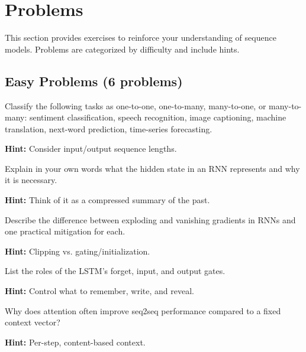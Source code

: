 
\section{Problems}
\label{sec:ch10-problems}

This section provides exercises to reinforce your understanding of sequence models. Problems are categorized by difficulty and include hints.

\subsection{Easy Problems (6 problems)}

\begin{problem}
Classify the following tasks as one-to-one, one-to-many, many-to-one, or many-to-many: sentiment classification, speech recognition, image captioning, machine translation, next-word prediction, time-series forecasting.

\textbf{Hint:} Consider input/output sequence lengths.
\end{problem}

\begin{problem}
Explain in your own words what the hidden state in an RNN represents and why it is necessary.

\textbf{Hint:} Think of it as a compressed summary of the past.
\end{problem}

\begin{problem}
Describe the difference between exploding and vanishing gradients in RNNs and one practical mitigation for each.

\textbf{Hint:} Clipping vs. gating/initialization.
\end{problem}

\begin{problem}
List the roles of the LSTM's forget, input, and output gates.

\textbf{Hint:} Control what to remember, write, and reveal.
\end{problem}

\begin{problem}
Why does attention often improve seq2seq performance compared to a fixed context vector?

\textbf{Hint:} Per-step, content-based context.
\end{problem}


